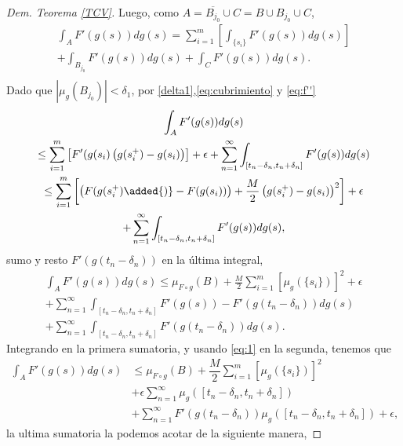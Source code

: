 \begin{proof}[Dem. Teorema \eqref{TCV}]
	Luego, como $A=\overline{B_{j_0}}\cup C=B\cup B_{j_0}\cup C$, 
	\begin{multline*}
		\int_{A}F'(g(s))dg(s)=\sum_{i=1}^{m}\left[ \int_{\{s_i\}}F'(g(s))dg(s)\right] \\+\int_{B_{j_0}}F'(g(s))dg(s)+\int_{C}F'(g(s))dg(s).\\
	\end{multline*}
Dado que  $|\mu_{g}(B_{j_0})|<\delta_1$, por \eqref{delta1},\eqref{eq:cubrimiento} y  \eqref{eq:f''}
		\begin{multline*}
			\int_{A}F'(g(s))dg(s)\\ \leq \sum_{i=1}^{m}\left[ F'(g(s_i)\left( g(s_i^+)-g(s_i)\right)  \right] +\epsilon+\sum_{n=1}^{\infty}\int_{[t_n-\delta_n, t_n+\delta_n]}F'(g(s))dg(s)\\ \leq 
		 \sum_{i=1}^{m}\left[ \left( F(g(s_i^+)\added{)}-F(g(s_i))\right) +\dfrac{M}{2}\left( g(s_i^+)-g(s_i)\right)^2  \right] +\epsilon\\+\sum_{n=1}^{\infty}\int_{[t_n-\delta_n, t_n+\delta_n]}F'(g(s))dg(s),
\end{multline*}
sumo y resto $F'(g(t_n-\delta_n))$ en la última integral,
	\begin{multline*}
\int_{A}F'(g(s))dg(s) 
	\leq \mu_{F\circ g}(B)+\frac{M}{2}\sum_{i=1}^{m}\left[ \mu_{g}(\{s_i\})\right] ^2+\epsilon \\+ \sum_{n=1}^{\infty}\int_{[t_n-\delta_n, t_n+\delta_n]}F'(g(s))-F'(g(t_n-\delta_n))dg(s)\\
+\sum_{n=1}^{\infty}\int_{[t_n-\delta_n, t_n+\delta_n]}F'(g(t_n-\delta_n))dg(s).
	\end{multline*}
 Integrando en la primera sumatoria, y usando \eqref{eq:1} en la segunda,  tenemos que
	\begin{equation}\label{eq:3.2}
	\begin{split}
		\int_{A}F'(g(s))dg(s)	&\leq \mu_{F\circ g}(B)+\dfrac{M}{2}\sum_{i=1}^{m} \left[ \mu_{g}(\{s_i\})\right] ^2  \\ &+\epsilon\sum_{n=1}^{\infty}\mu_{g}\left( [t_n-\delta_n, t_n+\delta_n]\right) \\&+ \sum_{n=1}^{\infty}F'(g(t_n-\delta_n))\mu_{g}([t_n-\delta_n,t_n+\delta_n] ) +\epsilon,
	\end{split}
\end{equation}
la ultima sumatoria la podemos acotar de la siguiente manera, \normalmarginpar{}\reversemarginpar

\end{proof}
